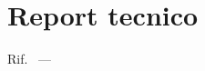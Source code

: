 
\showlogo{\doclogo}

\section{Report tecnico}

{\large Rif.\ \texttt{\rif{\docriferimento}} --- \rifdesc{\docriferimento}}
\vspace{6mm}


